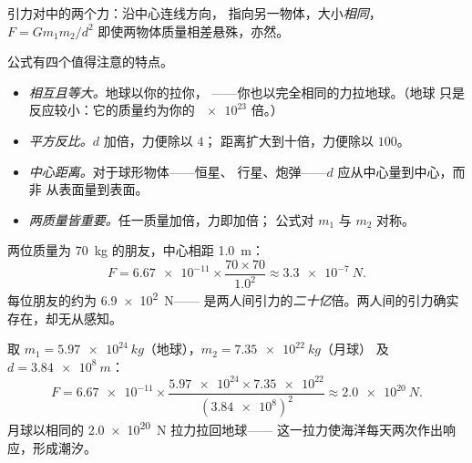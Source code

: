 \begin{omfigure}

{\small 引力对中的两个力：沿中心连线方向，
指向另一物体，大小\emph{相同}，
$F = G m_1 m_2 / d^2$ 即使两物体质量相差悬殊，亦然。}
\end{omfigure}

\begin{remark}[读懂公式]\label{rem:g10:universal-gravitation:reading}
公式有四个值得注意的特点。
\begin{itemize}
  \item \emph{相互且等大。}地球以你的拉你，
        ——你也以完全相同的力拉地球。（地球
        只是反应较小：它的质量约为你的
        $\num{e23}$ 倍。）
  \item \emph{平方反比。}$d$ 加倍，力便除以 $4$；
        距离扩大到十倍，力便除以 $100$。
  \item \emph{中心距离。}对于球形物体——恒星、
        行星、炮弹——$d$ 应从中心量到中心，而非
        从表面量到表面。
  \item \emph{两质量皆重要。}任一质量加倍，力即加倍；
        公式对 $m_1$ 与 $m_2$ 对称。
\end{itemize}
\end{remark}

\begin{example}[两个朋友]\label{ex:g10:universal-gravitation:friends}
两位质量为 \qty{70}{kg} 的朋友，中心相距 \qty{1.0}{m}：
\[
F = \num{6.67e-11} \times \frac{70 \times 70}{1.0^2}
\approx \qty{3.3e-7}{N}.
\]
每位朋友的约为 \qty{6.9e2}{N}——
是两人间引力的\emph{二十亿}倍。两人间的引力确实存在，却无从感知。
\end{example}

\begin{example}[地球束缚月球]\label{ex:g10:universal-gravitation:earthmoon}
取 $m_1 = \qty{5.97e24}{kg}$（地球），$m_2 = \qty{7.35e22}{kg}$（月球）
及 $d = \qty{3.84e8}{m}$：
\[
F = \num{6.67e-11} \times
\frac{\num{5.97e24} \times \num{7.35e22}}{(\num{3.84e8})^2}
\approx \qty{2.0e20}{N}.
\]
月球以相同的 \qty{2.0e20}{N} 拉力拉回地球——
这一拉力使海洋每天两次作出响应，形成潮汐。
\end{example}

